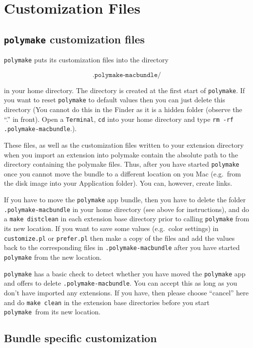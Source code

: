 \documentclass[a4paper]{amsart}
\newcommand{\polymake}{\texttt{polymake}\xspace}
\begin{document}
\section*{Customization Files}

\subsection*{\polymake customization files}

\polymake puts its customization files into the directory 

\[\texttt{.polymake-macbundle/} \]

in your home directory. The directory is created at the first start of \polymake. If you want to reset \polymake to default values then you can just delete this directory (You cannot do this in the Finder as it is a hidden folder (observe the ``.'' in front). Open a \texttt{Terminal}, \texttt{cd} into your home directory and type \texttt{rm -rf .polymake-macbundle}.).

These files, as well as the customization files written to your extension directory when you import an extension into polymake contain the absolute path to the directory containing the polymake files. Thus, after you have started \polymake once you cannot move the bundle to a different location on you Mac (e.g.\ from the disk image into your Application folder). You can, however, create links.

If you have to move the \polymake app bundle, then you have to delete the folder \texttt{.polymake-macbundle} in your home directory (see above for instructions), and do a \texttt{make distclean} in each extension base directory prior to calling \polymake from its new location. If you want to save some values (e.g.\ color settings) in \texttt{customize.pl} or \texttt{prefer.pl} then make a copy of the files and add the values back to the corresponding files in \texttt{.polymake-macbundle} after you have started \polymake from the new location.

\polymake has a basic check to detect whether you have moved the \polymake app and offers to delete \texttt{.polymake-macbundle}. You can accept this as long as you don't have imported any extensions. If you have, then please choose ``cancel'' here and do \texttt{make clean} in the extension base directories before you start \polymake\ from its new location.

\subsection*{Bundle specific customization}
\end{document}
